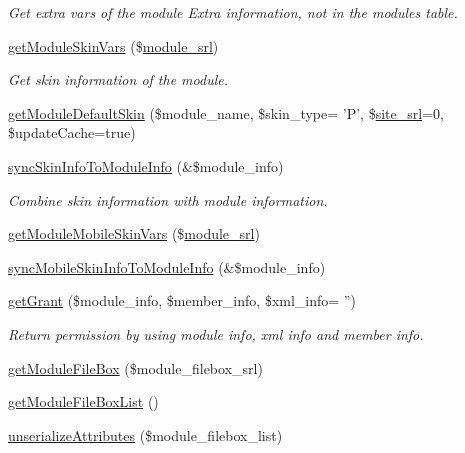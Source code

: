 \begin{DoxyCompactItemize}
\begin{DoxyCompactList}\small\item\em Get extra vars of the module Extra information, not in the modules table. \end{DoxyCompactList}\item 
\hyperlink{classmoduleModel_aa3828c94af2b1c8b84fafd423038445d}{get\-Module\-Skin\-Vars} (\$\hyperlink{ko_8install_8php_a370bb6450fab1da3e0ed9f484a38b761}{module\-\_\-srl})
\begin{DoxyCompactList}\small\item\em Get skin information of the module. \end{DoxyCompactList}\item 
\hyperlink{classmoduleModel_a0a77bcbc85aa39eebe18687ab6e0b974}{get\-Module\-Default\-Skin} (\$module\-\_\-name, \$skin\-\_\-type= 'P', \$\hyperlink{ko_8install_8php_a8b1406b4ad1048041558dce6bfe89004}{site\-\_\-srl}=0, \$update\-Cache=true)
\item 
\hyperlink{classmoduleModel_af9179765de4796b45236b62be16eb8fb}{sync\-Skin\-Info\-To\-Module\-Info} (\&\$module\-\_\-info)
\begin{DoxyCompactList}\small\item\em Combine skin information with module information. \end{DoxyCompactList}\item 
\hyperlink{classmoduleModel_aef7f4760b4c1864752d1042e1a0667c8}{get\-Module\-Mobile\-Skin\-Vars} (\$\hyperlink{ko_8install_8php_a370bb6450fab1da3e0ed9f484a38b761}{module\-\_\-srl})
\item 
\hyperlink{classmoduleModel_ae90cd832480cf8c46e96d95c20a63387}{sync\-Mobile\-Skin\-Info\-To\-Module\-Info} (\&\$module\-\_\-info)
\item 
\hyperlink{classmoduleModel_a0d6431efeb3e3d377dbbb20b414ba074}{get\-Grant} (\$module\-\_\-info, \$member\-\_\-info, \$xml\-\_\-info= '')
\begin{DoxyCompactList}\small\item\em Return permission by using module info, xml info and member info. \end{DoxyCompactList}\item 
\hyperlink{classmoduleModel_a792e14b71d66044513a646a44216be17}{get\-Module\-File\-Box} (\$module\-\_\-filebox\-\_\-srl)
\item 
\hyperlink{classmoduleModel_a8f3a098b40649594a591e5ea8bd15d96}{get\-Module\-File\-Box\-List} ()
\item 
\hyperlink{classmoduleModel_a60ec88f0d61e7a44887bebba8048a18d}{unserialize\-Attributes} (\$module\-\_\-filebox\-\_\-list)

\end{DoxyCompactItemize}
